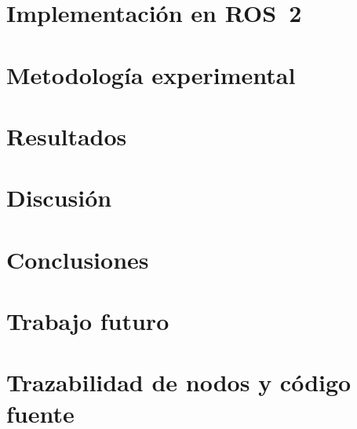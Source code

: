 \documentclass[a4paper,12pt]{report}
\begin{document}
    \chapter{Implementación en ROS~2}
    \label{chap:implementacion}

    \chapter{Metodología experimental}
    \label{chap:experimentos}

    \chapter{Resultados}
    \label{chap:resultados}

    \chapter{Discusión}
    \label{chap:discusion}

    \chapter{Conclusiones}
    \label{chap:conclusiones}

    \chapter{Trabajo futuro}
    \label{chap:futuro}

    \appendix
    \chapter{Trazabilidad de nodos y código fuente}
    \label{anexo:trazabilidad}
    


    \newpage
    \printbibliography
\end{document}
